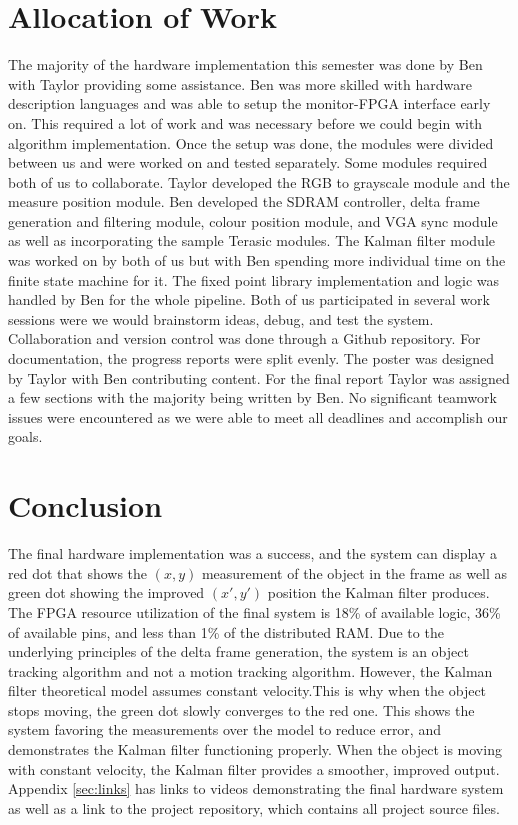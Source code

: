 \documentclass[11pt]{article} %
\begin{document}
\section{Allocation of Work}
The majority of the hardware implementation this semester was done by Ben with Taylor providing some assistance. Ben was more skilled with hardware description languages and was able to setup the monitor-FPGA interface early on. This required a lot of work and was necessary before we could begin with algorithm implementation. Once the setup was done, the modules were divided between us and were worked on and tested separately. Some modules required both of us to collaborate. Taylor developed the RGB to grayscale module and the measure position module. Ben developed the SDRAM controller, delta frame generation and filtering module, colour position module, and VGA sync module as well as incorporating the sample Terasic modules. The Kalman filter module was worked on by both of us but with Ben spending more individual time on the finite state machine for it. The fixed point library implementation and logic was handled by Ben for the whole pipeline. Both of us participated in several work sessions were we would brainstorm ideas, debug, and test the system. Collaboration and version control was done through a Github repository. For documentation, the progress reports were split evenly. The poster was designed by Taylor with Ben contributing content. For the final report Taylor was assigned a few sections with the majority being written by Ben. No significant teamwork issues were encountered as we were able to meet all deadlines and accomplish our goals.
\section{Conclusion}
The final hardware implementation was a success, and the system can display a red dot that shows the $(x,y)$ measurement of the object in the frame as well as green dot showing the improved $(x',y')$ position the Kalman filter produces. The FPGA resource utilization of the final system is 18\% of available logic, 36\% of available pins, and less than 1\% of the distributed RAM. Due to the underlying principles of the delta frame generation, the system is an object tracking algorithm and not a motion tracking algorithm. However, the Kalman filter theoretical model assumes constant velocity.This is why when the object stops moving, the green dot slowly converges to the red one. This shows the system favoring the measurements over the model to reduce error, and demonstrates the Kalman filter functioning properly. When the object is moving with constant velocity, the Kalman filter provides a smoother, improved output. Appendix \ref{sec:links} has links to videos demonstrating the final hardware system as well as a link to the project repository, which contains all project source files.
\end{document}

